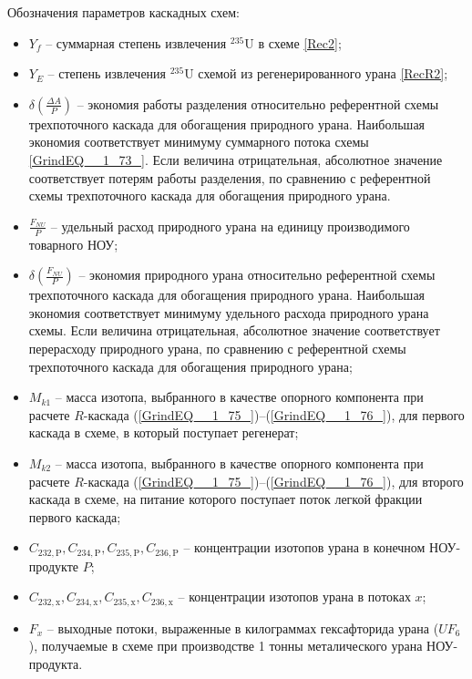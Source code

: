 Обозначения параметров каскадных схем:
\begin{itemize}
    \item $Y_f$ -- суммарная степень извлечения $^{235}$U в схеме \ref{Rec2};
    \item $Y_{E}$ -- степень извлечения $^{235}$U схемой из регенерированного урана \ref{RecR2};
    \item $\delta(\frac{\Delta A}{P})$ -- экономия работы разделения относительно референтной схемы трехпоточного каскада для обогащения природного урана. Наибольшая экономия соответствует минимуму суммарного потока схемы \ref{GrindEQ__1_73_}. Если величина отрицательная, абсолютное значение соответствует потерям работы разделения, по сравнению с референтной схемы трехпоточного каскада для обогащения природного урана.
    \item  $\frac{F_{NU}}{P}$ -- удельный расход природного урана на единицу производимого товарного НОУ;
    \item  $\delta(\frac{F_{NU}}{P})$ -- экономия природного урана относительно референтной схемы трехпоточного каскада для обогащения природного урана.  Наибольшая экономия соответствует минимуму удельного расхода природного урана схемы. Если величина отрицательная, абсолютное значение соответствует перерасходу природного урана, по сравнению с референтной схемы трехпоточного каскада для обогащения природного урана;
    \item $M_{k1}$ -- масса изотопа, выбранного в качестве опорного компонента при расчете $R$-каскада (\ref{GrindEQ__1_75_})--(\ref{GrindEQ__1_76_}), для первого каскада в схеме, в который поступает регенерат;
    \item $M_{k2}$ -- масса изотопа, выбранного в качестве опорного компонента при расчете $R$-каскада (\ref{GrindEQ__1_75_})--(\ref{GrindEQ__1_76_}), для второго каскада в схеме, на питание которого поступает поток легкой фракции первого каскада;
    \item $C_{232,\text{P}},C_{234,\text{P}},C_{235,\text{P}},C_{236,\text{P}}$ -- концентрации изотопов урана в конечном НОУ-продукте $P$;
    \item $C_{232,\text{x}},C_{234,\text{x}},C_{235,\text{x}},C_{236,\text{x}}$ -- концентрации изотопов урана в потоках $x$;
    \item $F_{x}$ -- выходные потоки, выраженные в килограммах гексафторида урана ($UF_6$), получаемые в схеме при производстве 1 тонны металического урана НОУ-продукта.
  \end{itemize}
  
\addtocounter{table}{-1}%
